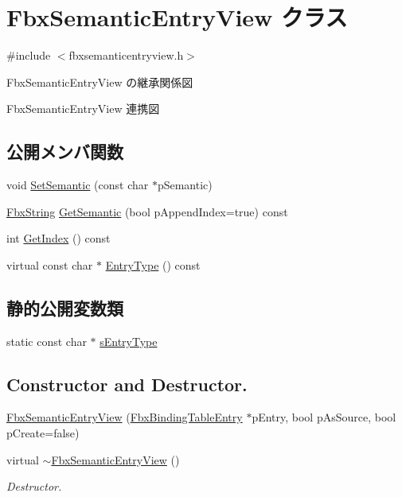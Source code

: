 \hypertarget{class_fbx_semantic_entry_view}{}\section{Fbx\+Semantic\+Entry\+View クラス}
\label{class_fbx_semantic_entry_view}


{\ttfamily \#include $<$fbxsemanticentryview.\+h$>$}



Fbx\+Semantic\+Entry\+View の継承関係図


Fbx\+Semantic\+Entry\+View 連携図
\subsection*{公開メンバ関数}
\begin{DoxyCompactItemize}
\item 
void \hyperlink{class_fbx_semantic_entry_view_a602f170055f7dc100360d0d11bb88c56}{Set\+Semantic} (const char $\ast$p\+Semantic)
\item 
\hyperlink{class_fbx_string}{Fbx\+String} \hyperlink{class_fbx_semantic_entry_view_ac1419433cb4547f9cbd42e4855976e43}{Get\+Semantic} (bool p\+Append\+Index=true) const
\item 
int \hyperlink{class_fbx_semantic_entry_view_a9163df1576880dd1fa1922eeeb122dfd}{Get\+Index} () const
\item 
virtual const char $\ast$ \hyperlink{class_fbx_semantic_entry_view_afd242ecac3eaab584dffe108753aba1d}{Entry\+Type} () const
\end{DoxyCompactItemize}
\subsection*{静的公開変数類}
\begin{DoxyCompactItemize}
\item 
static const char $\ast$ \hyperlink{class_fbx_semantic_entry_view_a971315cc135c67cb4ca164a69fe6f6b2}{s\+Entry\+Type}
\end{DoxyCompactItemize}
\subsection*{Constructor and Destructor.}
\begin{DoxyCompactItemize}
\item 
\hyperlink{class_fbx_semantic_entry_view_a9431f63d5fdde94d264056fa3f3b6df1}{Fbx\+Semantic\+Entry\+View} (\hyperlink{class_fbx_binding_table_entry}{Fbx\+Binding\+Table\+Entry} $\ast$p\+Entry, bool p\+As\+Source, bool p\+Create=false)
\item 
virtual \hyperlink{class_fbx_semantic_entry_view_a3efcf8b9e3ff9b4d9656910786f88238}{$\sim$\+Fbx\+Semantic\+Entry\+View} ()
\begin{DoxyCompactList}\small\item\em Destructor. \end{DoxyCompactList}\end{DoxyCompactItemize}
